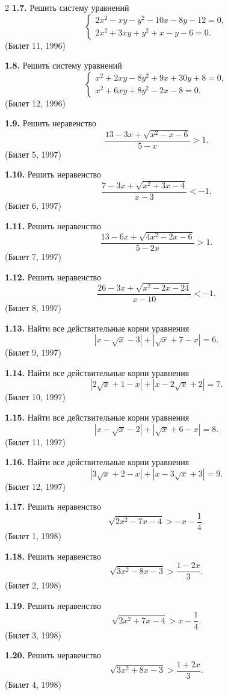 \documentclass[14pt,a4paper,landscape]{extarticle}
\begin{document}
\begin{multicols}{2}
\textbf{1.7.} Решить систему уравнений
\[
\begin{cases}
2x^2 - xy - y^2 - 10x - 8y - 12 = 0, \\
2x^2 + 3xy + y^2 + x - y - 6 = 0.
\end{cases}
\]
\hfill \textnormal{(Билет 11, 1996)}

\textbf{1.8.} Решить систему уравнений
\[
\begin{cases}
x^2 + 2xy - 8y^2 + 9x + 30y + 8 = 0, \\
x^2 + 6xy + 8y^2 - 2x - 8 = 0.
\end{cases}
\]
\hfill \textnormal{(Билет 12, 1996)}

\textbf{1.9.} Решить неравенство
\[
\frac{13 - 3x + \sqrt{x^2 - x - 6}}{5 - x} > 1.
\]
\hfill \textnormal{(Билет 5, 1997)}

\textbf{1.10.} Решить неравенство
\[
\frac{7 - 3x + \sqrt{x^2 + 3x - 4}}{x - 3} < -1.
\]
\hfill \textnormal{(Билет 6, 1997)}

\textbf{1.11.} Решить неравенство
\[
\frac{13 - 6x + \sqrt{4x^2 - 2x - 6}}{5 - 2x} > 1.
\]
\hfill \textnormal{(Билет 7, 1997)}

\textbf{1.12.} Решить неравенство
\[
\frac{26 - 3x + \sqrt{x^2 - 2x - 24}}{x - 10} < -1.
\]
\hfill \textnormal{(Билет 8, 1997)}

\textbf{1.13.} Найти все действительные корни уравнения
\[
|x - \sqrt{x}-3| + |\sqrt{x} + 7 - x| = 6.
\]
\hfill \textnormal{(Билет 9, 1997)}

\textbf{1.14.} Найти все действительные корни уравнения
\[
|2\sqrt{x} + 1 - x| + |x - 2\sqrt{x}+2| = 7.
\]
\hfill \textnormal{(Билет 10, 1997)}

\textbf{1.15.} Найти все действительные корни уравнения
\[
|x - \sqrt{x}-2| + |\sqrt{x} + 6 - x| = 8.
\]
\hfill \textnormal{(Билет 11, 1997)}

\textbf{1.16.} Найти все действительные корни уравнения
\[
|3\sqrt{x} + 2 - x| + |x - 3\sqrt{x} + 3| = 9.
\]
\hfill \textnormal{(Билет 12, 1997)}

\textbf{1.17.} Решить неравенство
\[
\sqrt{2x^2 - 7x - 4} > - x - \frac{1}{4}.
\]
\hfill \textnormal{(Билет 1, 1998)}

\textbf{1.18.} Решить неравенство
\[
\sqrt{3x^2 - 8x - 3} > \frac{1 - 2x}{3}.
\]
\hfill \textnormal{(Билет 2, 1998)}

\textbf{1.19.} Решить неравенство
\[
\sqrt{2x^2 + 7x - 4} > x - \frac{1}{4}.
\]
\hfill \textnormal{(Билет 3, 1998)}

\textbf{1.20.} Решить неравенство
\[
\sqrt{3x^2 + 8x - 3} > \frac{1 + 2x}{3}.
\]
\hfill \textnormal{(Билет 4, 1998)}


\end{multicols}
\end{document}
